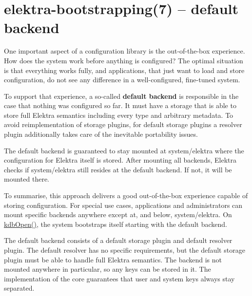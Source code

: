 \section*{elektra-\/bootstrapping(7) -- default backend }

One important aspect of a configuration library is the out-\/of-\/the-\/box experience. How does the system work before anything is configured? The optimal situation is that everything works fully, and applications, that just want to load and store configuration, do not see any difference in a well-\/configured, fine-\/tuned system.

To support that experience, a so-\/called {\bfseries default backend} is responsible in the case that nothing was configured so far. It must have a storage that is able to store full Elektra semantics including every type and arbitrary metadata. To avoid reimplementation of storage plugins, for default storage plugins a resolver plugin additionally takes care of the inevitable portability issues.

The default backend is guaranteed to stay mounted at {\ttfamily system/elektra} where the configuration for Elektra itself is stored. After mounting all backends, Elektra checks if {\ttfamily system/elektra} still resides at the default backend. If not, it will be mounted there.

To summarise, this approach delivers a good out-\/of-\/the-\/box experience capable of storing configuration. For special use cases, applications and administrators can mount specific backends anywhere except at, and below, {\ttfamily system/elektra}. On {\ttfamily \hyperlink{group__kdb_ga6808defe5870f328dd17910aacbdc6ca}{kdb\+Open()}}, the system bootstraps itself starting with the default backend.

The default backend consists of a default storage plugin and default resolver plugin. The default resolver has no specific requirements, but the default storage plugin must be able to handle full Elektra semantics. The backend is not mounted anywhere in particular, so any keys can be stored in it. The implementation of the core guarantees that user and system keys always stay separated. 